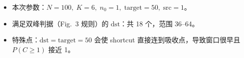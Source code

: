 \begin{itemize}
  \item 本次参数：$N=100,\;K=6,\;n_0=1,\;\mathrm{target}=50,\;\mathrm{src}=1$。
  \item 满足双峰判据（Fig.~3 规则）的 $\mathrm{dst}$：共 18 个，范围 36--64。
  \item 特殊点：$\mathrm{dst}=\mathrm{target}=50$ 会使 shortcut 直接连到吸收点，导致窗口很早且 $P(C\geq 1)$ 接近 1。
\end{itemize}
